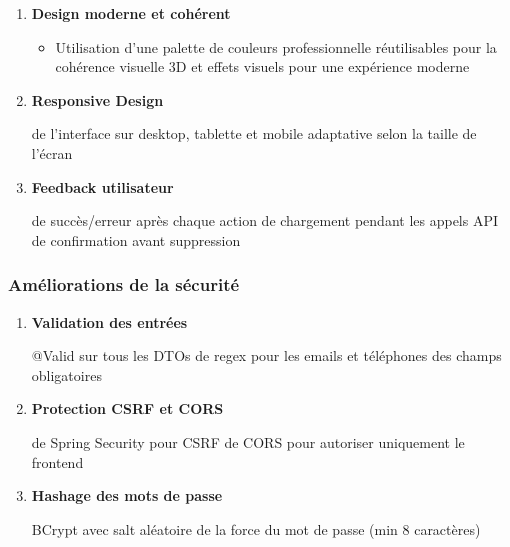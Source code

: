 \documentclass[12pt,a4paper]{report}
\begin{document}
\begin{enumerate}[leftmargin=1cm]
    \item \textbf{Design moderne et cohérent}
    \begin{itemize}
        \item Utilisation d'une palette de couleurs professionnelle
        \composants réutilisables pour la cohérence visuelle
        \comique 3D et effets visuels pour une expérience moderne
    \end{itemize}
    
    \item \textbf{Responsive Design}
    \begin{itemize}
        \comptement de l'interface sur desktop, tablette et mobile
        \comique adaptative selon la taille de l'écran
    \end{itemize}
    
    \item \textbf{Feedback utilisateur}
    \begin{itemize}
        \comiques de succès/erreur après chaque action
        \comique de chargement pendant les appels API
        \comiques de confirmation avant suppression
    \end{itemize}
\end{enumerate}

\subsubsection{Améliorations de la sécurité}

\begin{enumerate}[leftmargin=1cm]
    \item \textbf{Validation des entrées}
    \begin{itemize}
        \comique @Valid sur tous les DTOs
        \comique de regex pour les emails et téléphones
        \comique des champs obligatoires
    \end{itemize}
    
    \item \textbf{Protection CSRF et CORS}
    \begin{itemize}
        \comique de Spring Security pour CSRF
        \comique de CORS pour autoriser uniquement le frontend
    \end{itemize}
    
    \item \textbf{Hashage des mots de passe}
    \begin{itemize}
        \comique BCrypt avec salt aléatoire
        \comique de la force du mot de passe (min 8 caractères)
    \end{itemize}
\end{enumerate}
\end{document}
